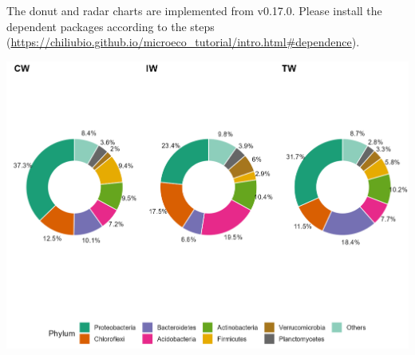\documentclass[
]{book}
\newenvironment{Shaded}{\begin{snugshade}}{\end{snugshade}}
\newcommand{\AttributeTok}[1]{\textcolor[rgb]{0.77,0.63,0.00}{#1}}
\newcommand{\ConstantTok}[1]{\textcolor[rgb]{0.00,0.00,0.00}{#1}}
\newcommand{\DecValTok}[1]{\textcolor[rgb]{0.00,0.00,0.81}{#1}}
\newcommand{\FunctionTok}[1]{\textcolor[rgb]{0.00,0.00,0.00}{#1}}
\newcommand{\NormalTok}[1]{#1}
\newcommand{\OtherTok}[1]{\textcolor[rgb]{0.56,0.35,0.01}{#1}}
\newcommand{\SpecialCharTok}[1]{\textcolor[rgb]{0.00,0.00,0.00}{#1}}
\newcommand{\StringTok}[1]{\textcolor[rgb]{0.31,0.60,0.02}{#1}}
\begin{document}
The donut and radar charts are implemented from v0.17.0.
Please install the dependent packages according to the steps (\url{https://chiliubio.github.io/microeco_tutorial/intro.html\#dependence}).

\begin{Shaded}
\end{Shaded}

\begin{center}\includegraphics[width=650px]{Images/trans_abund_donut} \end{center}
\end{document}
